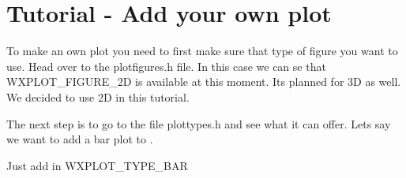 \chapter{Tutorial -\/ Add your own plot}
\hypertarget{md__c_1_2_users_2danie_2_documents_2_git_hub_2wx_plot_2wx_plot_2_r_e_a_d_m_e}{}\label{md__c_1_2_users_2danie_2_documents_2_git_hub_2wx_plot_2wx_plot_2_r_e_a_d_m_e}
\label{md__c_1_2_users_2danie_2_documents_2_git_hub_2wx_plot_2wx_plot_2_r_e_a_d_m_e_autotoc_md0}%
%


To make an own plot you need to first make sure that type of figure you want to use. Head over to the {\ttfamily plotfigures.\+h} file. In this case we can se that {\ttfamily WXPLOT\+\_\+\+FIGURE\+\_\+2D} is available at this moment. It\textquotesingle{}s planned for 3D as well. We decided to use 2D in this tutorial.


\begin{DoxyCode}{0}
\DoxyCodeLine{\textcolor{preprocessor}{\#pragma\ once}}
\DoxyCodeLine{}
\DoxyCodeLine{\textcolor{keyword}{typedef}\ \textcolor{keyword}{enum}\ \{}
\DoxyCodeLine{\ \ \ \ \textcolor{comment}{//\ Add\ more\ here}}

\end{DoxyCode}


The next step is to go to the file {\ttfamily plottypes.\+h} and see what it can offer. Let\textquotesingle{}s say we want to add a {\ttfamily bar} plot to {\ttfamily {}}.


\begin{DoxyCode}{0}
\DoxyCodeLine{\textcolor{preprocessor}{\#pragma\ once}}
\DoxyCodeLine{}
\DoxyCodeLine{\textcolor{keyword}{typedef}\ \textcolor{keyword}{enum}\ \{}
\DoxyCodeLine{\ \ \ \ \textcolor{comment}{//\ Add\ more\ here}}

\end{DoxyCode}
 Just add in {\ttfamily WXPLOT\+\_\+\+TYPE\+\_\+\+BAR}


\begin{DoxyCode}{0}
\DoxyCodeLine{\textcolor{preprocessor}{\#pragma\ once}}
\DoxyCodeLine{}
\DoxyCodeLine{\textcolor{keyword}{typedef}\ \textcolor{keyword}{enum}\ \{}
\DoxyCodeLine{\ \ \ \ \textcolor{comment}{//\ Add\ more\ here}}

\end{DoxyCode}


